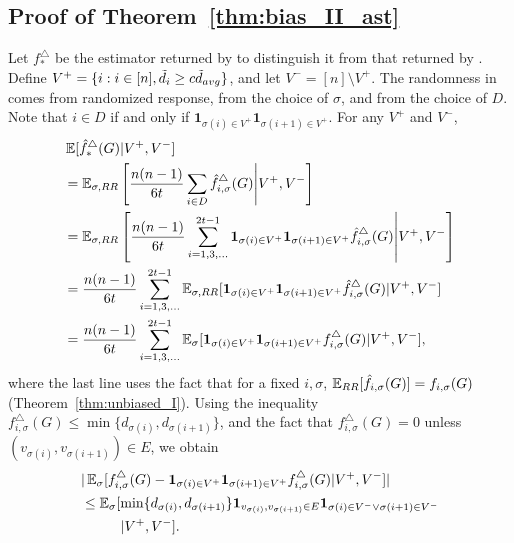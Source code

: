 \subsection{Proof of Theorem~\ref{thm:bias_II_ast}}
\label{sub:bias_II_ast_proof}
Let $f^\triangle_*$ be the estimator returned by \AlgWSTriVR{} to distinguish
it from that returned by \AlgWSTri{}.
Define $V^+ = \{i : i \in [n], \tilde{d}_i \geq c \tilde{d}_{avg} \}$, and let $V^- = [n]
\setminus V^+$.
The randomness in \AlgWSTriVR{} comes
from randomized response, from the choice of $\sigma$, and from the choice of
$D$. Note that $i \in D$ if and only if $\textbf{1}_{\sigma(i) \in V^+}
\textbf{1}_{\sigma(i+1) \in V^+}$. For any $V^+$ and $V^-$,
\begin{align}
  &\operatorname{\mathbb{E}}[\hat{f}^\triangle_*(G) | V^+,V^-] \nonumber \\
  &= \operatorname{\mathbb{E}}_{\sigma,RR}\left[\frac{n(n-1)}{6t}\sum_{i \in D}
  \hat{f}^\triangle_{i, \sigma}(G) \middle| V^+,V^- \right] \nonumber \\
  &= \operatorname{\mathbb{E}}_{\sigma,RR}\left[\frac{n(n-1)}{6t}\sum_{i = 1,3,\ldots}^{2t-1}
  \textbf{1}_{\sigma(i) \in V^+}\textbf{1}_{\sigma(i+1) \in V^+} \hat{f}^\triangle_{i,
  \sigma}(G) \middle| V^+,V^- \right] \nonumber \\
  &= \frac{n(n-1)}{6t}\sum_{i = 1,3,\ldots}^{2t-1}
  \operatorname{\mathbb{E}}_{\sigma,RR}[\textbf{1}_{\sigma(i) \in V^+}\textbf{1}_{\sigma(i+1) \in V^+}
  \hat{f}^\triangle_{i, \sigma}(G) | V^+,V^-] \nonumber \\
  &= \frac{n(n-1)}{6t}\sum_{i = 1,3,\ldots}^{2t-1}
  \operatorname{\mathbb{E}}_\sigma[\textbf{1}_{\sigma(i) \in V^+}\textbf{1}_{\sigma(i+1) \in V^+} f^\triangle_{i,
  \sigma}(G) | V^+,V^-], \label{eq:exp-expand}
\end{align}
where the last line uses the fact that for a fixed $i,\sigma$,
$\operatorname{\mathbb{E}}_{RR}[\hat{f}_{i,\sigma}(G)] = f_{i,\sigma}(G)$
(Theorem~\ref{thm:unbiased_I}). Using the inequality $f_{i,\sigma}^\triangle(G)
\leq \min\{d_{\sigma(i)}, \allowbreak d_{\sigma(i+1)}\}$, and the fact that
$f_{i,\sigma}^\triangle(G) = 0$ unless $(v_{\sigma(i)},v_{\sigma(i+1)}) \in E$, we obtain
\begin{align*}
  &|\E_{\sigma}[f_{i,\sigma}^\triangle(G) - \textbf{1}_{\sigma(i)\in V^+}
  \textbf{1}_{\sigma(i+1)\in V^+} f_{i,\sigma}^\triangle(G)|V^+,V^-]| \\
  &\leq
  \E_{\sigma}[\min\{d_{\sigma(i)}, d_{\sigma(i+1)}\}\textbf{1}_{v_{\sigma(i)},v_{\sigma(i+1)} \in E}\textbf{1}_{\sigma(i) \in V^-
  \vee \sigma(i+1) \in V^-} \\
  & \hspace{10mm} | V^+,V^-].
\end{align*}
